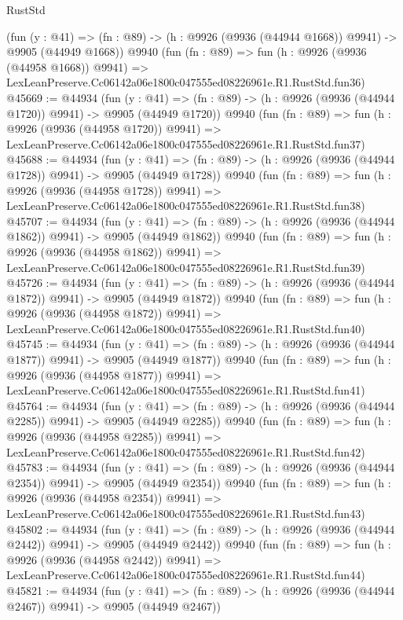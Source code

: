 \begin{lexlean}{RustStd}
\begin{coremodule}
    (fun (y : @41) =>
    (fn : @89) -> (h : @9926 (@9936 (@44944 @1668)) @9941) -> @9905 (@44949 @1668))
    @9940
    (fun (fn : @89) =>
    fun (h : @9926 (@9936 (@44958 @1668)) @9941) =>
    LexLeanPreserve.Cc06142a06e1800c047555ed08226961e.R1.RustStd.fun36)
@45669 := @44934
    (fun (y : @41) =>
    (fn : @89) -> (h : @9926 (@9936 (@44944 @1720)) @9941) -> @9905 (@44949 @1720))
    @9940
    (fun (fn : @89) =>
    fun (h : @9926 (@9936 (@44958 @1720)) @9941) =>
    LexLeanPreserve.Cc06142a06e1800c047555ed08226961e.R1.RustStd.fun37)
@45688 := @44934
    (fun (y : @41) =>
    (fn : @89) -> (h : @9926 (@9936 (@44944 @1728)) @9941) -> @9905 (@44949 @1728))
    @9940
    (fun (fn : @89) =>
    fun (h : @9926 (@9936 (@44958 @1728)) @9941) =>
    LexLeanPreserve.Cc06142a06e1800c047555ed08226961e.R1.RustStd.fun38)
@45707 := @44934
    (fun (y : @41) =>
    (fn : @89) -> (h : @9926 (@9936 (@44944 @1862)) @9941) -> @9905 (@44949 @1862))
    @9940
    (fun (fn : @89) =>
    fun (h : @9926 (@9936 (@44958 @1862)) @9941) =>
    LexLeanPreserve.Cc06142a06e1800c047555ed08226961e.R1.RustStd.fun39)
@45726 := @44934
    (fun (y : @41) =>
    (fn : @89) -> (h : @9926 (@9936 (@44944 @1872)) @9941) -> @9905 (@44949 @1872))
    @9940
    (fun (fn : @89) =>
    fun (h : @9926 (@9936 (@44958 @1872)) @9941) =>
    LexLeanPreserve.Cc06142a06e1800c047555ed08226961e.R1.RustStd.fun40)
@45745 := @44934
    (fun (y : @41) =>
    (fn : @89) -> (h : @9926 (@9936 (@44944 @1877)) @9941) -> @9905 (@44949 @1877))
    @9940
    (fun (fn : @89) =>
    fun (h : @9926 (@9936 (@44958 @1877)) @9941) =>
    LexLeanPreserve.Cc06142a06e1800c047555ed08226961e.R1.RustStd.fun41)
@45764 := @44934
    (fun (y : @41) =>
    (fn : @89) -> (h : @9926 (@9936 (@44944 @2285)) @9941) -> @9905 (@44949 @2285))
    @9940
    (fun (fn : @89) =>
    fun (h : @9926 (@9936 (@44958 @2285)) @9941) =>
    LexLeanPreserve.Cc06142a06e1800c047555ed08226961e.R1.RustStd.fun42)
@45783 := @44934
    (fun (y : @41) =>
    (fn : @89) -> (h : @9926 (@9936 (@44944 @2354)) @9941) -> @9905 (@44949 @2354))
    @9940
    (fun (fn : @89) =>
    fun (h : @9926 (@9936 (@44958 @2354)) @9941) =>
    LexLeanPreserve.Cc06142a06e1800c047555ed08226961e.R1.RustStd.fun43)
@45802 := @44934
    (fun (y : @41) =>
    (fn : @89) -> (h : @9926 (@9936 (@44944 @2442)) @9941) -> @9905 (@44949 @2442))
    @9940
    (fun (fn : @89) =>
    fun (h : @9926 (@9936 (@44958 @2442)) @9941) =>
    LexLeanPreserve.Cc06142a06e1800c047555ed08226961e.R1.RustStd.fun44)
@45821 := @44934
    (fun (y : @41) =>
    (fn : @89) -> (h : @9926 (@9936 (@44944 @2467)) @9941) -> @9905 (@44949 @2467))

\end{coremodule}
\end{lexlean}
